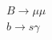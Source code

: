 \documentclass[preprint,3p,12pt]{elsarticle}
\begin{document}
{\textbf{$B\to \mu\mu$}\\

\textbf{$b\to s \gamma$}\\

}
\end{document}
